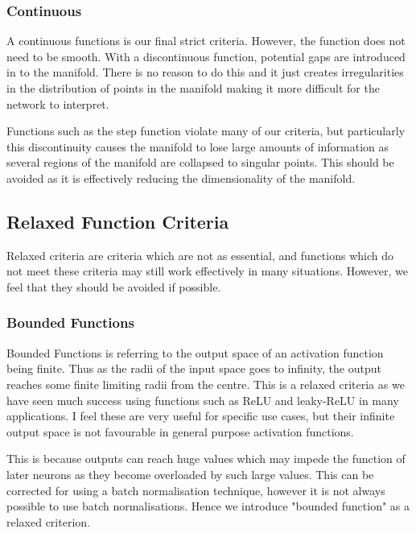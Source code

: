 \documentclass[onecolumn]{article}
\begin{document}
    \subsubsection{Continuous}
    
    A continuous functions is our final strict criteria. However, the function does not need to be smooth. With a discontinuous function, potential gaps are introduced in to the manifold. There is no reason to do this and it just creates irregularities in the distribution of points in the manifold making it more difficult for the network to interpret.
    
    Functions such as the step function violate many of our criteria, but particularly this discontinuity causes the manifold to lose large amounts of information as several regions of the manifold are collapsed to singular points. This should be avoided as it is effectively reducing the dimensionality of the manifold.


    \subsection{Relaxed Function Criteria}
        
    Relaxed criteria are criteria which are not as essential, and functions which do not meet these criteria may still work effectively in many situations. However, we feel that they should be avoided if possible.
        
    \subsubsection{Bounded Functions}
        
    Bounded Functions is referring to the output space of an activation function being finite. Thus as the radii of the input space goes to infinity, the output reaches some finite limiting radii from the centre. This is a relaxed criteria as we have seen much success using functions such as ReLU and leaky-ReLU in many applications. I feel these are very useful for specific use cases, but their infinite output space is not favourable in general purpose activation functions.
    
    This is because outputs can reach huge values which may impede the function of later neurons as they become overloaded by such large values. This can be corrected for using a batch normalisation technique, however it is not always possible to use batch normalisations. Hence we introduce "bounded function" as a relaxed criterion.
       
\end{document}
